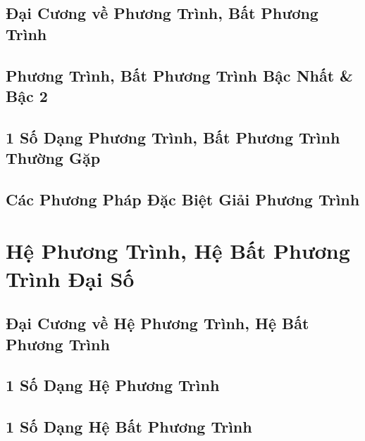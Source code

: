 \documentclass{article}
\numberwithin{equation}{section}
\begin{document}
\subsection{Đại Cương về Phương Trình, Bất Phương Trình}


\subsection{Phương Trình, Bất Phương Trình Bậc Nhất \& Bậc 2}


\subsection{1 Số Dạng Phương Trình, Bất Phương Trình Thường Gặp}


\subsection{Các Phương Pháp Đặc Biệt Giải Phương Trình}


\section{Hệ Phương Trình, Hệ Bất Phương Trình Đại Số}


\subsection{Đại Cương về Hệ Phương Trình, Hệ Bất Phương Trình}


\subsection{1 Số Dạng Hệ Phương Trình}


\subsection{1 Số Dạng Hệ Bất Phương Trình}


\printbibliography[heading=bibintoc]
	
\end{document}
